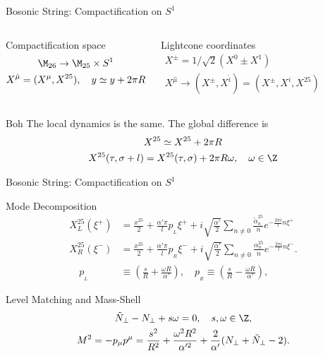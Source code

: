 \begin{frame}{Bosonic String: Compactification on \texorpdfstring{$S^1$}{S1}}
	\begin{columns}[t]
		\begin{block}{Compactification space}
			\setlength\abovedisplayskip{0pt}
			\begin{gather*}
				\M_{26} \to \M_{25} \times S^1 \\
				X^{\hat{\mu}} = (X^\mu, X^{25}), \quad y \simeq y + 2\pi R
			\end{gather*}
		\end{block}
		\begin{block}{Lightcone coordinates}
			\setlength\abovedisplayskip{0pt}
			\begin{gather*}
				X^\pm = {1}/{\sqrt{2}}(X^0 \pm X^1) \\
				X^{\hat{\mu}} \to (X^\pm, X^{\hat{i}}) = (X^\pm, X^{i}, X^{25})
			\end{gather*}
		\end{block}
	\end{columns}
	\begin{block}{Boh}
		The \alert{local dynamics} is the \alert{same}. The global difference is
		\begin{gather*}
			X^{25} \simeq X^{25} + 2 \pi R \\
			X^{25}(\tau, \sigma + l) = X^{25}(\tau,\sigma) + 2 \pi R \omega, \quad \omega \in \Z
		\end{gather*}
	\end{block}
\end{frame}

\begin{frame}{Bosonic String: Compactification on \texorpdfstring{$S^1$}{S1}}
	\begin{block}{Mode Decomposition}
		\setlength\abovedisplayskip{0pt}
		\begin{align*}
			X^{25}_L(\xi^+) & = \frac{x^{25}}{2} + \frac{\alpha' \pi}{l} p_{\!_L} \xi^+ + i \sqrt{\frac{\alpha'}{2}} \sum_{n\neq 0} \frac{\tilde{\alpha}^{25}_n}{n}e^{-\frac{2\pi i}{l}n \xi^+} \\
			X^{25}_R(\xi^-) & = \frac{x^{25}}{2} + \frac{\alpha' \pi}{l} p_{\!_R} \xi^- + i \sqrt{\frac{\alpha'}{2}} \sum_{n\neq 0} \frac{{\alpha}^{25}_n}{n}e^{-\frac{2\pi i}{l}n \xi^-}.      \\
			\quad p_{\!_L}  & \equiv \left( \frac{s}{R} + \frac{\omega R}{\alpha'} \right), \quad p_{\!_R} \equiv \left( \frac{s}{R} - \frac{\omega R}{\alpha'} \right) ,
		\end{align*}
	\end{block}
	\begin{block}{Level Matching and Mass-Shell}
		\setlength\abovedisplayskip{0pt}
		\begin{gather*}
			\tilde{N}_\perp - N_\perp + s \omega = 0, \quad s,\omega \in \Z, \\
			M^2 = - p_\mu p^\mu = \frac{s^2}{R^2} + \frac{\omega^2 R^2}{\alpha'^2} + \frac{2}{\alpha'} (N_\perp + \tilde{N}_\perp - 2) .
		\end{gather*}
	\end{block}
\end{frame}


